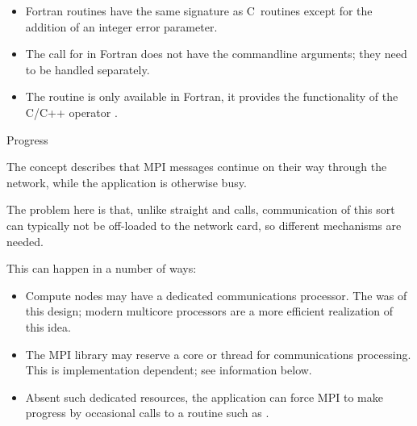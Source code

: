 \begin{itemize}
\item Fortran routines have the same signature as C~routines except for the addition
  of an integer error parameter.
\item The call for
   in Fortran
  does not have the commandline arguments;
  they need to be handled separately.
\item The routine  is only available in
  Fortran, it provides the functionality of the C/C++ operator
  .
\end{itemize}


 {Progress}
\label{sec:progress}

The concept  describes
that MPI messages continue on their way through the network,
while the application is otherwise busy.

The problem here is that, unlike straight  and
 calls,
communication of this sort can 
typically not be off-loaded to the network card, so different
mechanisms are needed.

This can happen in a number of ways:
\begin{itemize}
\item Compute nodes may have a dedicated communications processor. The
   was of this design; modern
  multicore processors are a more efficient realization of this idea.
\item The MPI library may reserve a core or thread for communications
  processing. This is implementation dependent;
  see  information below.
\item Absent such dedicated resources, the application can force MPI
  to make progress by occasional calls to a 
  routine such as .
\end{itemize}

